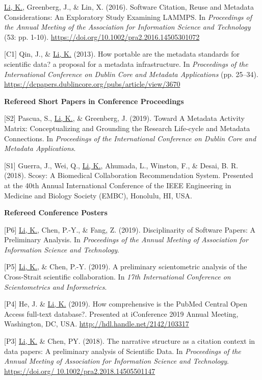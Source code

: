 \documentclass[margin, 10pt]{res} %
\begin{document}
\begin{resume}
[C2] \underline{Li, K.}, Greenberg, J., \& Lin, X. (2016). Software Citation, Reuse and Metadata Considerations: An Exploratory Study Examining LAMMPS. In \textit{Proceedings of the Annual Meeting of the Association for Information Science and Technology} (53: pp. 1-10). \href{https://doi.org/10.1002/pra2.2016.14505301072}{https://doi.org/10.1002/pra2.2016.14505301072}

[C1] Qin, J., \& \underline{Li, K.} (2013). How portable are the metadata standards for scientific data? a proposal for a metadata infrastructure. In \textit{Proceedings of the International Conference on Dublin Core and Metadata Applications} (pp. 25–34). \href{https://dcpapers.dublincore.org/pubs/article/view/3670}{https://dcpapers.dublincore.org/pubs/article/view/3670}

\textbf{Refereed Short Papers in Conference Proceedings}

[S2] Pascua, S., \underline{Li, K.}, \& Greenberg, J. (2019). Toward A Metadata Activity Matrix: Conceptualizing and Grounding the Research Life-cycle and Metadata Connections. In \textit{Proceedings of the International Conference on Dublin Core and Metadata Applications}.

[S1] Guerra, J., Wei, Q., \underline{Li, K.}, Ahumada, L., Winston, F., \& Desai, B. R. (2018). Scosy: A Biomedical Collaboration Recommendation System. Presented at the 40th Annual International Conference of the IEEE Engineering in Medicine and Biology Society (EMBC), Honolulu, HI, USA.

\textbf{Refereed Conference Posters}

[P6] \underline{Li, K.}, Chen, P.-Y., \& Fang, Z. (2019). Disciplinarity of Software Papers: A Preliminary Analysis. In \textit{Proceedings of the Annual Meeting of Association for Information Science and Technology}.

[P5] \underline{Li, K.}, \& Chen, P.-Y. (2019). A preliminary scientometric analysis of the Cross-Strait scientific collaboration. In \textit{17th International Conference on Scientometrics and Informetrics}.

[P4] He, J. \& \underline{Li, K.} (2019). How comprehensive is the PubMed Central Open Access full-text database?. Presented at iConference 2019 Annual Meeting, Washington, DC, USA. \href{http://hdl.handle.net/2142/103317}{http://hdl.handle.net/2142/103317}

[P3] \underline{Li, K.} \& Chen, PY. (2018). The narrative structure as a citation context in data papers: A preliminary analysis of Scientific Data. In \textit{Proceedings of the Annual Meeting of Association for Information Science and Technology}. \href{https://doi.org/10.1002/pra2.2018.14505501147}{https://doi.org/ 10.1002/pra2.2018.14505501147}


\end{resume}
\end{document}

